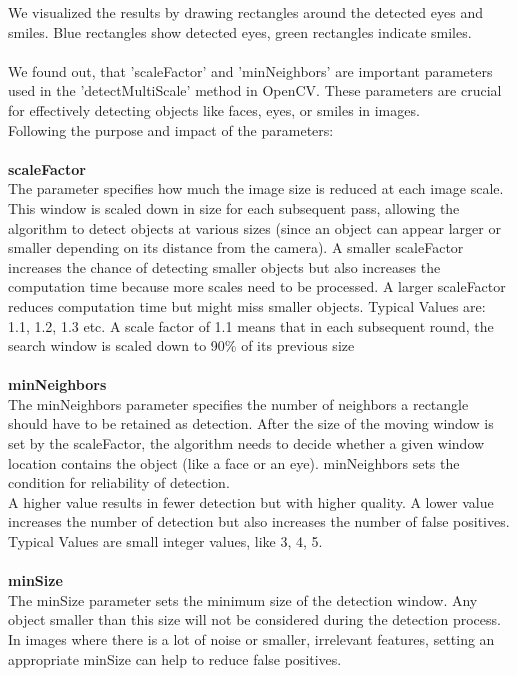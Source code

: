 \documentclass[11pt, a4paper, twocolumn]{article}
\begin{document}
We visualized the results by drawing rectangles around the detected eyes and smiles. Blue rectangles show detected eyes, green rectangles indicate smiles.\\\\
%
We found out, that 'scaleFactor' and 'minNeighbors' are important parameters used in the 'detectMultiScale' method in OpenCV. These parameters are crucial for effectively detecting objects like faces, eyes, or smiles in images. \\
Following the purpose and impact of the parameters:\\\\
\textbf{scaleFactor}\\
The parameter specifies how much the image size is reduced at each image scale. This window is scaled down in size for each subsequent pass, allowing the algorithm to detect objects at various sizes (since an object can appear larger or smaller depending on its distance from the camera).
A smaller scaleFactor increases the chance of detecting smaller objects but also increases the computation time because more scales need to be processed. A larger scaleFactor reduces computation time but might miss smaller objects.
Typical Values are: 1.1, 1.2, 1.3 etc. 
A scale factor of 1.1 means that in each subsequent round, the search window is scaled down to 90\% of its previous size\\\\
\textbf{minNeighbors}\\
The minNeighbors parameter specifies the number of neighbors a rectangle should have to be retained as detection. After the size of the moving window is set by the scaleFactor, the algorithm needs to decide whether a given window location contains the object (like a face or an eye). minNeighbors sets the condition for reliability of detection.\\
A higher value results in fewer detection but with higher quality. A lower value increases the number of detection but also increases the number of false positives. \\
Typical Values are small integer values, like 3, 4, 5.\\\\
\textbf{minSize}\\
The minSize parameter sets the minimum size of the detection window. Any object smaller than this size will not be considered during the detection process.
In images where there is a lot of noise or smaller, irrelevant features, setting an appropriate minSize can help to reduce false positives.\\
\end{document}
